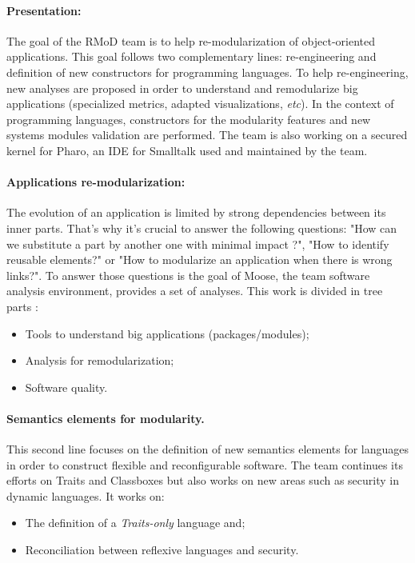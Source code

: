\paragraph{Presentation: } The goal of the RMoD team is to help re-modularization of object-oriented applications. This goal follows two complementary lines: re-engineering and definition of new constructors for programming languages. To help re-engineering, new analyses are proposed in order to understand and remodularize big applications (specialized metrics, adapted visualizations, \emph{etc}). In the context of programming languages, constructors for the modularity features and new systems modules validation are performed. The team is also working on a secured kernel for Pharo, an \gls{IDE} for Smalltalk used and maintained by the team.

\paragraph{Applications re-modularization: } The evolution of an application is limited by strong dependencies between its inner parts. That's why it's crucial to answer the following questions:
"How can we substitute a part by another one with minimal impact ?", "How to identify reusable elements?" or "How to modularize an application when there is wrong links?". To answer those questions is the goal of Moose, the team software analysis environment, provides a set of analyses.
This work is divided in tree parts :
	\begin{itemize}
		\item Tools to understand big applications (packages/modules);
		\item Analysis for remodularization;
		\item Software quality.
	\end{itemize}
	
\paragraph{Semantics elements for modularity.} This second line focuses on the definition of new semantics elements for languages in order to construct flexible and reconfigurable software. The team continues its efforts on Traits and Classboxes but also works on new areas such as security in dynamic languages. It works on:
	\begin{itemize}
		\item The definition of a \emph{Traits-only} language and;
		\item Reconciliation between reflexive languages and security.
	\end{itemize}